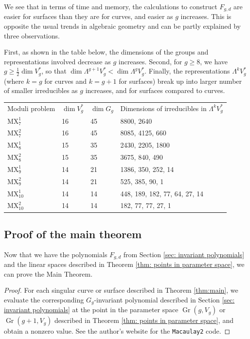 \documentclass{amsart}[12pt]
\theoremstyle{definition}
\numberwithin{equation}{section}
\newcommand{\Gr}{\operatorname{Gr}}
\newcommand{\mywedge}{\mathsf{\Lambda}}
\newcommand{\mukai}{\mathrm{MX}}
\begin{document}
We see that in terms of time and memory, the calculations to construct $F_{g,d}$ are easier for surfaces than they are for curves, and easier as $g$ increases. This
is opposite the usual trends in algebraic geometry and can be partly explained
by three observations.

First, as shown in the table below, the dimensions of the groups and representations involved
decrease as $g$ increases. Second, for $g \geq 8$, we have $g \geq \frac{1}{2} \dim V_g^{*}$, so
that $\dim \mywedge^{g+1} V_g^{*} < \dim \mywedge^{g} V_g^{*} $. Finally, the representations $\mywedge^{k} V_g^{*} $ (where $k=g$ for curves and $k=g+1$ for surfaces)  break up into larger number of smaller irreducibles as $g$ increases, and for
surfaces compared to curves. 

\begin{center}
\begin{tabular}{llll}
  Moduli problem & $\dim V_g^{*}$ & $\dim G_g$ & Dimensions of irreducibles in $\mywedge^{k} V_g^{*} $\\
 $\mukai^{1}_7$ & 16 & 45 & 8800, 2640 \\
  $\mukai^{2}_7$ & 16 & 45 & 8085, 4125, 660 \\
 $\mukai^{1}_8$ & 15 & 35 & 2430, 2205, 1800 \\
  $\mukai^{2}_8$ &15 & 35 & 3675, 840, 490 \\
 $\mukai^{1}_9$ &14 & 21&  1386, 350, 252, 14\\
  $\mukai^{2}_9$ & 14 & 21 & 525, 385, 90, 1 \\
 $\mukai^{1}_{10}$ & 14 & 14 & 448, 189, 182, 77, 64, 27, 14 \\
 $\mukai^{2}_{10}$ & 14 & 14 & 182, 77, 77, 27, 1 \\           
\end{tabular}
\end{center}



\subsection{Proof of the main theorem}

Now that we have the polynomials $F_{g,d}$ from Section \ref{sec:
  invariant polynomials} and the linear spaces described in Theorem
\ref{thm: points in parameter space}, we can prove the Main Theorem. 

\begin{proof}
  For each singular curve or surface described in Theorem
  \ref{thm:main}, we evaluate the corresponding $G_g$-invariant
  polynomial described in Section \ref{sec: invariant polynomials} at
  the point in the parameter space $\Gr(g,V_g)$ or $\Gr(g+1,V_g)$
  described in Theorem \ref{thm: points in parameter space}, and
  obtain a nonzero value. See the author's website \cite{Code} for the
  \texttt{Macaulay2} code.
\end{proof}
\end{document}
